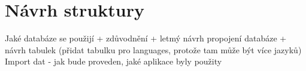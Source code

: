 \chapter{Návrh struktury}
Jaké databáze se použijí + zdůvodnění + letmý návrh propojení databáze + návrh tabulek (přidat tabulku pro languages, protože tam může být více jazyků) \newline
Import dat - jak bude proveden, jaké aplikace byly použity